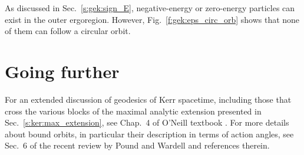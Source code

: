\begin{remark}
As discussed in Sec.~\ref{s:gek:sign_E}, negative-energy or zero-energy particles can exist in
the outer ergoregion. However, Fig.~\ref{f:gek:eps_circ_orb} shows that none
of them can follow a circular orbit.
\end{remark}





\section{Going further}

For an extended discussion of geodesics of Kerr spacetime, including those
that cross the various blocks of the maximal analytic extension presented in
Sec.~\ref{s:ker:max_extension}, see Chap.~4 of O'Neill textbook \cite{ONeil95}.
For more details about bound orbits, in particular their description in
terms of action angles, see
Sec.~6 of the recent review by Pound and Wardell \cite{PoundW21} and
references therein.


